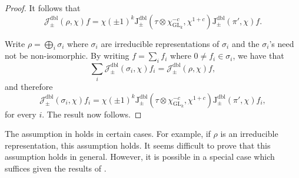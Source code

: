 \documentclass[12pt, reqno]{amsart}
\theoremstyle{definition}
\theoremstyle{definition}
\theoremstyle{definition}
\newcommand{\minusInvolution}[1]{#1^{-c}}
\newcommand{\involutionPlusOne}[1]{#1^{1+c}}
\newcommand{\GL}{\mathrm{GL}}
\newcommand{\dblJacobiSum}[2]{\mathcal{J}_{\pm}^{\mathrm{dbl}}\left(#1, #2\right)}
\newcommand{\dblJacobiSumScalar}[2]{\mathrm{J}_{\pm}^{\mathrm{dbl}}\left(#1, #2\right)}
\begin{document}
\begin{proof}
	It follows that $$\dblJacobiSum{\rho}{\chi} f = \chi\left(\pm 1\right)^k\dblJacobiSumScalar{\tau \otimes \minusInvolution{\chi_{\GL_k}}}{\involutionPlusOne{\chi}} \dblJacobiSumScalar{\pi'}{\chi} f.$$
	
	Write $\rho = \bigoplus_i \sigma_i$ where $\sigma_i$ are irreducible representations of $\sigma_i$ and the $\sigma_i$'s need not be non-isomorphic. By writing $f = \sum_{i} f_i$ where $0 \ne f_i \in \sigma_i$, we have that $$\sum_i \dblJacobiSum{\sigma_i}{\chi} f_i = \dblJacobiSum{\rho}{\chi} f,$$
	and therefore $$\dblJacobiSum{\sigma_i}{\chi} f_i = \chi\left(\pm 1\right)^k\dblJacobiSumScalar{\tau \otimes \minusInvolution{\chi_{\GL_k}}}{\involutionPlusOne{\chi}} \dblJacobiSumScalar{\pi'}{\chi} f_i,$$
	for every $i$. The result now follows.
\end{proof}
The assumption in  holds in certain cases. For example, if $\rho$ is an irreducible representation, this assumption holds. It seems difficult to prove that this assumption holds in general. However, it is possible in a special case which suffices given the results of \cite{GirschZelingher2025}.
\end{document}
